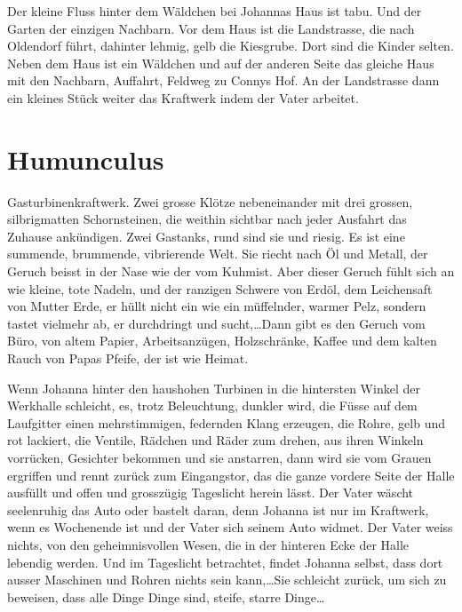 Der kleine Fluss hinter dem Wäldchen bei Johannas Haus ist tabu. Und der Garten der einzigen Nachbarn. Vor dem Haus ist die Landstrasse, die nach Oldendorf führt, dahinter lehmig, gelb die Kiesgrube. Dort sind die Kinder selten. Neben dem Haus ist ein Wäldchen und auf der anderen Seite das gleiche Haus mit den Nachbarn, Auffahrt, Feldweg zu Connys Hof. An der Landstrasse dann ein kleines Stück weiter das Kraftwerk indem der Vater arbeitet.



\section*{Humunculus}



Gasturbinenkraftwerk. Zwei grosse Klötze nebeneinander mit drei grossen, silbrigmatten Schornsteinen, die weithin sichtbar nach jeder Ausfahrt das Zuhause ankündigen. Zwei Gastanks, rund sind sie und riesig. Es ist eine summende, brummende, vibrierende Welt. Sie riecht nach Öl und Metall, der Geruch beisst in der Nase wie der vom Kuhmist. Aber dieser Geruch fühlt sich an wie kleine, tote Nadeln, und der ranzigen Schwere von Erdöl, dem Leichensaft von Mutter Erde, er hüllt nicht ein wie ein müffelnder, warmer Pelz, sondern tastet vielmehr ab, er durchdringt und sucht,\dots Dann gibt es den Geruch vom Büro, von altem Papier, Arbeitsanzügen, Holzschränke, Kaffee und dem kalten Rauch von Papas Pfeife, der ist wie Heimat.

Wenn Johanna hinter den haushohen Turbinen in die hintersten Winkel der Werkhalle schleicht, es, trotz Beleuchtung, dunkler wird, die Füsse auf dem Laufgitter einen mehrstimmigen, federnden Klang erzeugen, die Rohre, gelb und rot lackiert, die Ventile, Rädchen und Räder zum drehen, aus ihren Winkeln vorrücken, Gesichter bekommen und sie anstarren, dann wird sie vom Grauen ergriffen und rennt zurück zum Eingangstor, das die ganze vordere Seite der Halle ausfüllt und offen und grosszügig Tageslicht herein lässt. Der Vater wäscht seelenruhig das Auto oder bastelt daran, denn Johanna ist nur im Kraftwerk, wenn es Wochenende ist und der Vater sich seinem Auto widmet. Der Vater weiss nichts, von den geheimnisvollen Wesen, die in  der hinteren Ecke der Halle lebendig werden. Und im Tageslicht betrachtet, findet Johanna selbst, dass dort ausser Maschinen und Rohren nichts sein kann,\dots Sie schleicht zurück, um sich zu beweisen, dass alle Dinge Dinge sind, steife, starre Dinge\dots

